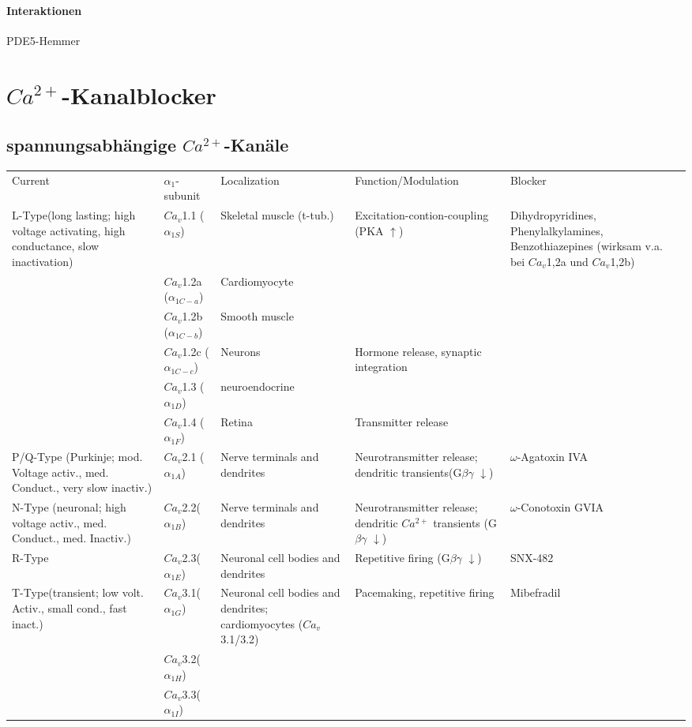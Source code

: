 \documentclass[10pt,a4paper]{report}
\begin{document}
\paragraph{Interaktionen} PDE5-Hemmer

\section{$Ca^{2+}$-Kanalblocker}
\subsection{spannungsabhängige $Ca^{2+}$-Kanäle}
\begin{tabularx}{\textwidth}{XXXXX}
Current&$\alpha_1$-subunit&Localization&Function/Modulation&Blocker\\
L-Type(long lasting; high voltage activating, high conductance, slow inactivation)&$Ca_v$1.1 ($\alpha_{1S}$)&Skeletal muscle (t-tub.)&Excitation-contion-coupling
(PKA $\uparrow$)&Dihydropyridines, Phenylalkylamines, Benzothiazepines (wirksam v.a. bei $Ca_v$1,2a und $Ca_v$1,2b)\\
&$Ca_v$1.2a ($\alpha_{1C-a}$)&Cardiomyocyte&&\\
&$Ca_v$1.2b ($\alpha_{1C-b}$)&Smooth muscle&&\\
&$Ca_v$1.2c ($\alpha_{1C-c}$)&Neurons&Hormone release, synaptic integration&\\
&$Ca_v$1.3 ($\alpha_{1D}$)&neuroendocrine&&\\
&$Ca_v$1.4 ($\alpha_{1F}$)&Retina&Transmitter release&\\
P/Q-Type (Purkinje; mod. Voltage activ., med. Conduct., very slow inactiv.)&$Ca_v$2.1 ($\alpha_{1A}$)&Nerve terminals and dendrites&Neurotransmitter release; dendritic  transients(G$\beta\gamma$ $\downarrow$)&$\omega$-Agatoxin IVA\\
N-Type (neuronal; high voltage activ., med. Conduct., med. Inactiv.)&$Ca_v$2.2($\alpha_{1B}$)&Nerve terminals and dendrites&Neurotransmitter release; dendritic $Ca^{2+}$ transients (G$\beta\gamma$ $\downarrow$)&$\omega$-Conotoxin GVIA\\
R-Type&$Ca_v$2.3($\alpha_{1E}$)&Neuronal cell bodies and dendrites&Repetitive firing (G$\beta\gamma$ $\downarrow$)&SNX-482\\
T-Type(transient; low volt. Activ., small cond., fast inact.)&$Ca_v$3.1($\alpha_{1G}$)&Neuronal cell bodies and dendrites; cardiomyocytes ($Ca_v$3.1/3.2)&Pacemaking, repetitive firing&Mibefradil\\
&$Ca_v$3.2($\alpha_{1H}$)&&&\\
&$Ca_v$3.3($\alpha_{1I}$)&&&\\
\end{tabularx}
\end{document}
